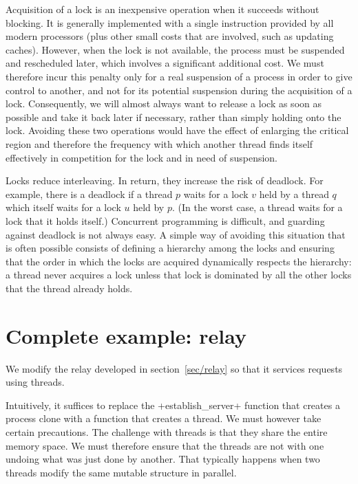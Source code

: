 Acquisition of a lock is an inexpensive operation when it succeeds
without blocking. It is generally implemented with a single
 instruction provided by all modern processors
(plus other small costs that are involved, such as updating caches).
However, when the lock is not available, the process must be suspended
and rescheduled later, which involves a significant additional cost.
We must therefore incur this penalty only for a real suspension of a
process in order to give control to another, and not for its potential
suspension during the acquisition of a lock.  Consequently, we will
almost always want to release a lock as soon as possible and take it
back later if necessary, rather than simply holding onto the lock.
Avoiding these two operations would have the effect of enlarging the
critical region and therefore the frequency with which another thread
finds itself effectively in competition for the lock and in need of
suspension.

Locks reduce interleaving.  In return, they increase the risk of
deadlock.  For example, there is a deadlock if a thread $p$ waits for
a lock $v$ held by a thread $q$ which itself waits for a lock $u$ held
by $p$.  (In the worst case, a thread waits for a lock that it holds
itself.)  Concurrent programming is difficult, and guarding against
deadlock is not always easy.  A simple way of avoiding this situation
that is often possible consists of defining a hierarchy among the
locks and ensuring that the order in which the locks are acquired
dynamically respects the hierarchy: a thread never acquires a lock
unless that lock is dominated by all the other locks that the thread
already holds.

\section{\label{ex/th-relais}Complete example: {\normalfont\http} relay}

We modify the {\http} relay developed in section~\ref{sec/relay} so
that it services requests using threads.

Intuitively, it suffices to replace the \ml+establish_server+ function
that creates a process clone with a function that creates a
thread.  We must however take certain precautions.  The challenge
with threads is that they share the entire memory space.  We must
therefore ensure that the threads are not  with one undoing what was just done by another.
That typically happens when two threads modify the same mutable
structure in parallel.

